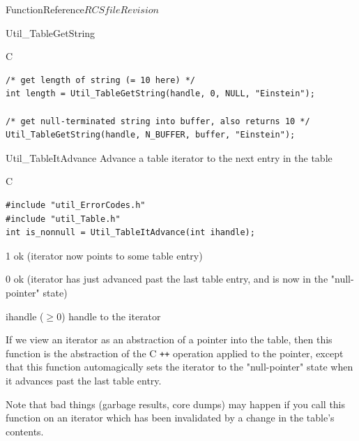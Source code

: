 \begin{cactuspart}{FunctionReference}{$RCSfile$}{$Revision$}
\begin{FunctionDescription}{Util\_TableGetString}
\begin{ExampleSection}
\begin{Example}{C}
\begin{verbatim}
/* get length of string (= 10 here) */
int length = Util_TableGetString(handle, 0, NULL, "Einstein");

/* get null-terminated string into buffer, also returns 10 */
Util_TableGetString(handle, N_BUFFER, buffer, "Einstein");
\end{verbatim}
\end{Example}
\end{ExampleSection}
\end{FunctionDescription}


\begin{FunctionDescription}{Util\_TableItAdvance}
\label{Util-TableItAdvance}
Advance a table iterator to the next entry in the table

\begin{SynopsisSection}
\begin{Synopsis}{C}
\begin{verbatim}
#include "util_ErrorCodes.h"
#include "util_Table.h"
int is_nonnull = Util_TableItAdvance(int ihandle);
\end{verbatim}
\end{Synopsis}
\end{SynopsisSection}

\begin{ResultSection}
\begin{Result}{\rm 1}
ok (iterator now points to some table entry)
\end{Result}
\begin{Result}{\rm 0}
ok (iterator has just advanced past the last table entry,
    and is now in the "null-pointer" state)
\end{Result}
\end{ResultSection}

\begin{ParameterSection}
\begin{Parameter}{ihandle ($\ge 0$)}
handle to the iterator
\end{Parameter}
\end{ParameterSection}

\begin{Discussion}
If we view an iterator as an abstraction of a pointer into the table,
then this function is the abstraction of the C \verb|++| operation applied
to the pointer, except that this function automagically sets the iterator
to the "null-pointer" state when it advances past the last table entry.

Note that bad things (garbage results, core dumps) may happen if
you call this function on an iterator which has been invalidated
by a change in the table's contents.
\end{Discussion}


\end{FunctionDescription}
\end{cactuspart}
